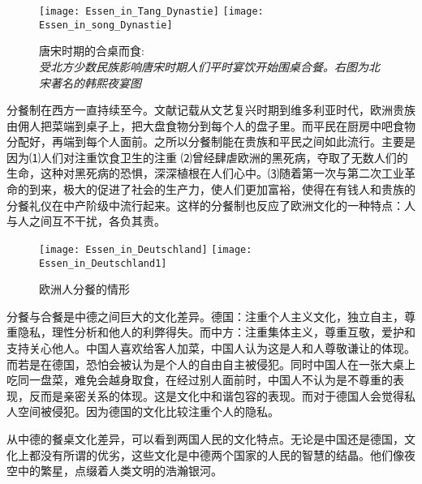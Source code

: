 \begin{figure}[htb]
\centering
\texttt{[image: Essen\_in\_Tang\_Dynastie]}
\texttt{[image: Essen\_in\_song\_Dynastie]}
\caption{唐宋时期的合桌而食:\\ \footnotesize\emph{受北方少数民族影响唐宋时期人们平时宴饮开始围桌合餐。右图为北宋著名的韩熙夜宴图}}
\end{figure}
\par
分餐制在西方一直持续至今。文献记载从文艺复兴时期到维多利亚时代，欧洲贵族由佣人把菜端到桌子上，把大盘食物分到每个人的盘子里。而平民在厨房中吧食物分配好，再端到每个人面前。之所以分餐制能在贵族和平民之间如此流行。主要是因为⑴人们对注重饮食卫生的注重 ⑵曾经肆虐欧洲的黑死病，夺取了无数人们的生命，这种对黑死病的恐惧，深深植根在人们心中。⑶随着第一次与第二次工业革命的到来，极大的促进了社会的生产力，使人们更加富裕，使得在有钱人和贵族的分餐礼仪在中产阶级中流行起来。这样的分餐制也反应了欧洲文化的一种特点：人与人之间互不干扰，各负其责。
\begin{figure}[htb]
\centering
\texttt{[image: Essen\_in\_Deutschland]}
\texttt{[image: Essen\_in\_Deutschland1]}
\caption{欧洲人分餐的情形}
\end{figure}

\par
分餐与合餐是中德之间巨大的文化差异。德国：注重个人主义文化，独立自主，尊重隐私，理性分析和他人的利弊得失。而中方：注重集体主义，尊重互敬，爱护和支持关心他人。中国人喜欢给客人加菜，中国人认为这是人和人尊敬谦让的体现。而若是在德国，恐怕会被认为是个人的自由自主被侵犯。同时中国人在一张大桌上吃同一盘菜，难免会越身取食，在经过别人面前时，中国人不认为是不尊重的表现，反而是亲密关系的体现。这是文化中和谐包容的表现。而对于德国人会觉得私人空间被侵犯。因为德国的文化比较注重个人的隐私。
\par
从中德的餐桌文化差异，可以看到两国人民的文化特点。无论是中国还是德国，文化上都没有所谓的优劣，这些文化是中德两个国家的人民的智慧的结晶。他们像夜空中的繁星，点缀着人类文明的浩瀚银河。
